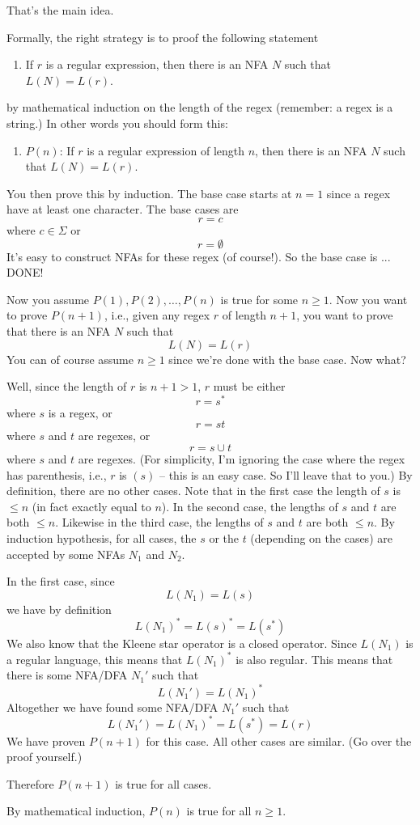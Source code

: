 That's the main idea.

Formally, the right strategy is to proof the following statement
\begin{enumerate}
\item[]
If $r$ is a regular expression, then there is an NFA $N$
such that $L(N) = L(r)$.
\end{enumerate}
by mathematical induction on the length of the regex 
(remember: a regex is a string.)
In other words you should form this:
\begin{enumerate}
\item[]
$P(n)$: If $r$ is a regular expression of length $n$, 
then there is an NFA $N$
such that $L(N) = L(r)$.
\end{enumerate}

You then prove this by induction.
The base case starts at $n = 1$ since a regex have at least one character.
The base cases are 
\[
r = c
\]
where $c \in \Sigma$ or
\[
r = \emptyset
\]
It's easy to construct NFAs for these regex (of course!).
So the base case is ... DONE!

Now you assume $P(1), P(2), \ldots, P(n)$ is true for some $n \geq 1$.
Now you want to prove $P(n+1)$, i.e., 
given any regex $r$ of length $n + 1$, you want to 
prove that there is an NFA $N$ such that
\[
L(N) = L(r)
\]
You can of course assume $n \geq 1$ since we're done with the base case.
Now what?

Well, since the length of $r$ is $n + 1 > 1$, $r$ must be either
\[
r = s^*
\]
where $s$ is a regex, or
\[
r = st
\]
where $s$ and $t$ are regexes, or
\[
r = s \cup t
\]
where $s$ and $t$ are regexes.
(For simplicity, I'm ignoring the case where the regex has parenthesis,
i.e., $r$ is $(s)$ -- this is an easy case. So I'll leave that to you.)
By definition, there are no other cases.
Note that in the first case the length of $s$ is $\leq n$ (in fact
exactly equal to $n$).
In the second case, the lengths of $s$ and $t$ are both $\leq n$.
Likewise in the third case, the lengths of $s$ and $t$ are both $\leq n$.
By induction hypothesis, for all cases, the $s$ or the $t$
(depending on the cases) are accepted by some NFAs $N_1$ and $N_2$.

In the first case,
since 
\[
L(N_1) = L(s)
\]
we have by definition
\[
L(N_1)^* = L(s)^* = L(s^*)
\]
We also know that the Kleene star operator is a closed operator.
Since $L(N_1)$ is a regular language, this means that 
$L(N_1)^*$ is also regular.
This means that there is some NFA/DFA $N_1'$ such that
\[
L(N_1') = L(N_1)^*
\]
Altogether we have found some NFA/DFA $N_1'$ such that
\[
L(N_1') = L(N_1)^* = L(s^*) = L(r)
\]
We have proven $P(n+1)$ for this case.
All other cases are similar. 
(Go over the proof yourself.)

Therefore $P(n+1)$ is true for all cases.

By mathematical induction, $P(n)$ is true for all $n \geq 1$.

